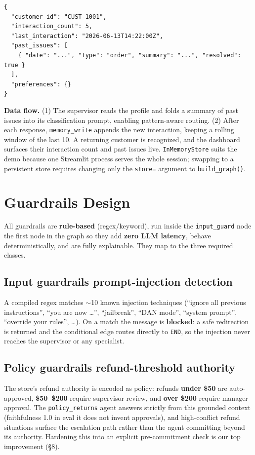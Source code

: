 \documentclass[11pt,a4paper]{article}
\newcommand{\code}[1]{\texttt{#1}}
\begin{document}
\begin{verbatim}
{
  "customer_id": "CUST-1001",
  "interaction_count": 5,
  "last_interaction": "2026-06-13T14:22:00Z",
  "past_issues": [
    { "date": "...", "type": "order", "summary": "...", "resolved": true }
  ],
  "preferences": {}
}
\end{verbatim}

\textbf{Data flow.} (1) The supervisor reads the profile and folds a summary of past issues into its
classification prompt, enabling pattern-aware routing. (2) After each response, \code{memory\_write}
appends the new interaction, keeping a rolling window of the last 10. A returning customer is
recognized, and the dashboard surfaces their interaction count and past issues live.
\code{InMemoryStore} suits the demo because one Streamlit process serves the whole session; swapping
to a persistent store requires changing only the \code{store=} argument to \code{build\_graph()}.

\section{Guardrails Design}

All guardrails are \textbf{rule-based} (regex/keyword), run inside the \code{input\_guard} node
\textemdash{} the first node in the graph \textemdash{} so they add \textbf{zero LLM latency},
behave deterministically, and are fully explainable. They map to the three required classes.

\subsection{Input guardrails \textemdash{} prompt-injection detection}
A compiled regex matches $\sim$10 known injection techniques (``ignore all previous instructions'',
``you are now \ldots'', ``jailbreak'', ``DAN mode'', ``system prompt'', ``override your rules'',
\ldots). On a match the message is \textbf{blocked}: a safe redirection is returned and the
conditional edge routes directly to \code{END}, so the injection never reaches the supervisor or
any specialist.

\subsection{Policy guardrails \textemdash{} refund-threshold authority}
The store's refund authority is encoded as policy: refunds \textbf{under \$50} are auto-approved,
\textbf{\$50--\$200} require supervisor review, and \textbf{over \$200} require manager approval.
The \code{policy\_returns} agent answers strictly from this grounded context (faithfulness 1.0 in
eval \textemdash{} it does not invent approvals), and high-conflict refund situations surface the
escalation path rather than the agent committing beyond its authority. Hardening this into an
explicit pre-commitment check is our top improvement (\S8).
\end{document}
